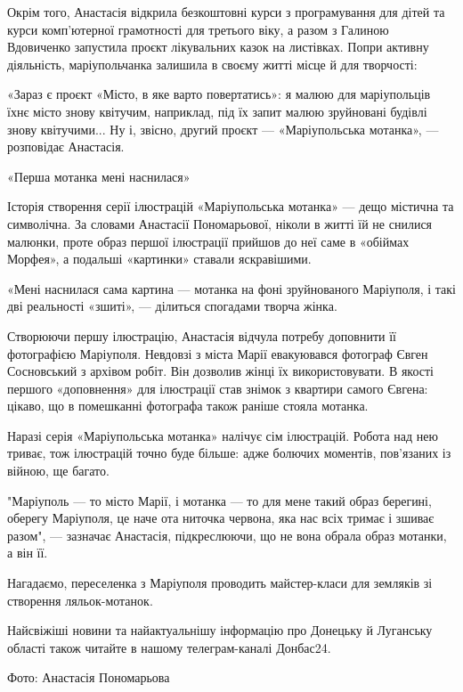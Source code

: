 Окрім того, Анастасія відкрила безкоштовні курси з програмування для дітей та
курси комп'ютерної грамотності для третього віку, а разом з Галиною Вдовиченко
запустила проєкт лікувальних казок на листівках. Попри активну діяльність,
маріупольчанка залишила в своєму житті місце й для творчості:

«Зараз є проєкт «Місто, в яке варто повертатись»: я малюю для маріупольців їхнє
місто знову квітучим, наприклад, під їх запит малюю зруйновані будівлі знову
квітучими... Ну і, звісно, другий проєкт — «Маріупольська мотанка», — розповідає
Анастасія.

«Перша мотанка мені наснилася»

Історія створення серії ілюстрацій «Маріупольська мотанка» — дещо містична та
символічна. За словами Анастасії Пономарьової, ніколи в житті їй не снилися
малюнки, проте образ першої ілюстрації прийшов до неї саме в «обіймах Морфея»,
а подальші «картинки» ставали яскравішими.

«Мені наснилася сама картина — мотанка на фоні зруйнованого Маріуполя, і такі
дві реальності «зшиті», — ділиться спогадами творча жінка.

Створюючи першу ілюстрацію, Анастасія відчула потребу доповнити її фотографією
Маріуполя. Невдовзі з міста Марії евакуювався фотограф Євген Сосновський з
архівом робіт. Він дозволив жінці їх використовувати. В якості першого
«доповнення» для ілюстрації став знімок з квартири самого Євгена: цікаво, що в
помешканні фотографа також раніше стояла мотанка.

Наразі серія «Маріупольська мотанка» налічує сім ілюстрацій. Робота над нею
триває, тож ілюстрацій точно буде більше: адже болючих моментів, пов'язаних із
війною, ще багато.

"Маріуполь — то місто Марії, і мотанка — то для мене такий образ берегині,
оберегу Маріуполя, це наче ота ниточка червона, яка нас всіх тримає і зшиває
разом", — зазначає Анастасія, підкреслюючи, що не вона обрала образ мотанки, а
він її.

Нагадаємо, переселенка з Маріуполя проводить майстер-класи для земляків зі
створення ляльок-мотанок.

Найсвіжіші новини та найактуальнішу інформацію про Донецьку й Луганську області
також читайте в нашому телеграм-каналі Донбас24.

Фото: Анастасія Пономарьова

